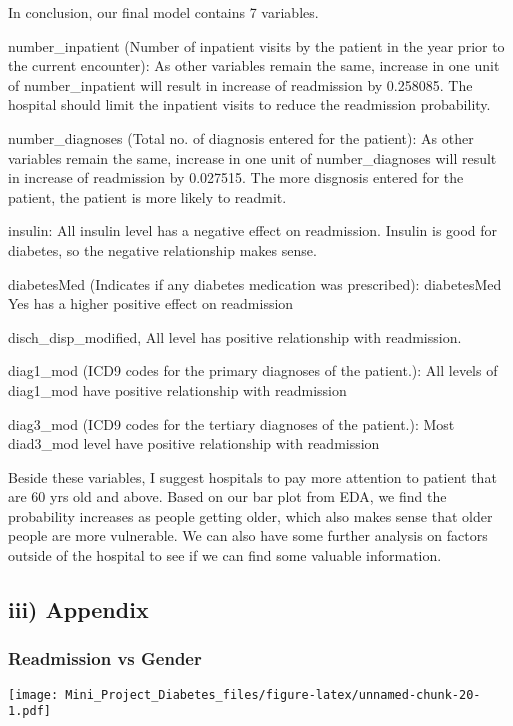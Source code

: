 \documentclass[]{article}
\begin{document}
In conclusion, our final model contains 7 variables.

number\_inpatient (Number of inpatient visits by the patient in the year
prior to the current encounter): As other variables remain the same,
increase in one unit of number\_inpatient will result in increase of
readmission by 0.258085. The hospital should limit the inpatient visits
to reduce the readmission probability.

number\_diagnoses (Total no. of diagnosis entered for the patient): As
other variables remain the same, increase in one unit of
number\_diagnoses will result in increase of readmission by 0.027515.
The more disgnosis entered for the patient, the patient is more likely
to readmit.

insulin: All insulin level has a negative effect on readmission. Insulin
is good for diabetes, so the negative relationship makes sense.

diabetesMed (Indicates if any diabetes medication was prescribed):
diabetesMed Yes has a higher positive effect on readmission

disch\_disp\_modified, All level has positive relationship with
readmission.

diag1\_mod (ICD9 codes for the primary diagnoses of the patient.): All
levels of diag1\_mod have positive relationship with readmission

diag3\_mod (ICD9 codes for the tertiary diagnoses of the patient.): Most
diad3\_mod level have positive relationship with readmission

Beside these variables, I suggest hospitals to pay more attention to
patient that are 60 yrs old and above. Based on our bar plot from EDA,
we find the probability increases as people getting older, which also
makes sense that older people are more vulnerable. We can also have some
further analysis on factors outside of the hospital to see if we can
find some valuable information.

\subsection{iii) Appendix}\label{iii-appendix}

\subsubsection{Readmission vs Gender}\label{readmission-vs-gender}

\texttt{[image: Mini\_Project\_Diabetes\_files/figure-latex/unnamed-chunk-20-1.pdf]}
\end{document}
